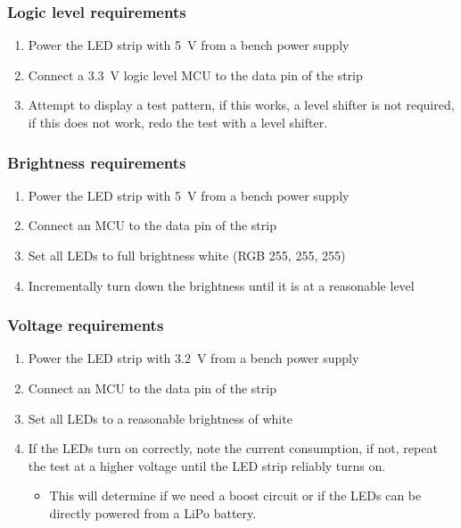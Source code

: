 \documentclass{notes}
\begin{document}
\subsubsection{Logic level requirements}
\begin{enumerate}
    \item Power the LED strip with \SI{5}{\volt} from a bench power supply
    \item Connect a \SI{3.3}{\volt} logic level MCU to the data pin of the strip
    \item Attempt to display a test pattern, if this works, a level shifter is not required, if this does not work, redo the test with a level shifter.
\end{enumerate}

\subsubsection{Brightness requirements}
\begin{enumerate}
    \item Power the LED strip with \SI{5}{\volt} from a bench power supply
    \item Connect an MCU to the data pin of the strip
    \item Set all LEDs to full brightness white (RGB 255, 255, 255)
    \item Incrementally turn down the brightness until it is at a reasonable level
\end{enumerate}

\subsubsection{Voltage requirements}
\begin{enumerate}
    \item Power the LED strip with \SI{3.2}{\volt} from a bench power supply
    \item Connect an MCU to the data pin of the strip
    \item Set all LEDs to a reasonable brightness of white
    \item If the LEDs turn on correctly, note the current consumption, if not, repeat the test at a higher voltage until the LED strip reliably turns on.
          \begin{itemize}
              \item This will determine if we need a boost circuit or if the LEDs can be directly powered from a LiPo battery.
          \end{itemize}
\end{enumerate}
\end{document}
